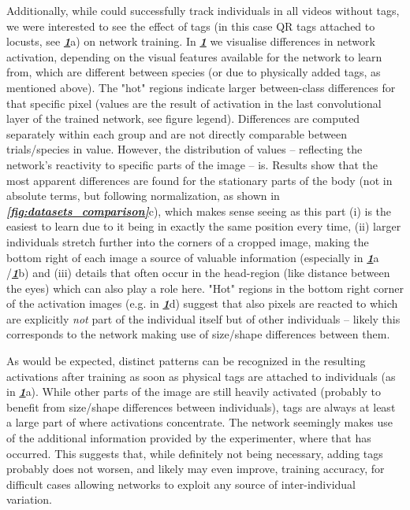 \documentclass[9pt,lineno]{elife}
\newcommand{\figref}[1]{\textit{\textbf{\ref{#1}}}}
\newcommand{\TRex}{\protect\path{TRex}}
\begin{document}
\begin{figure}[h]
\label{fig:network_activations}
\end{figure}

Additionally, while \TRex{} could successfully track individuals in all videos without tags, we were interested to see the effect of tags (in this case QR tags attached to locusts, see \figref{fig:network_activations}a)  %
on network training. In \figref{fig:network_activations} we visualise differences in network activation, depending on the visual features available for the network to learn from, which are different between species (or due to physically added tags, as mentioned above). The "hot" regions indicate larger between-class differences for that specific pixel (values are the result of activation in the last convolutional layer of the trained network, see figure legend). Differences are computed separately within each group and are not directly comparable between trials/species in value. However, the distribution of values -- reflecting the network's reactivity to specific parts of the image -- is. Results show that the most apparent differences are found for the stationary parts of the body (not in absolute terms, but following normalization, as shown in \figref{fig:datasets_comparison}c), which makes sense seeing as this part (i) is the easiest to learn due to it being in exactly the same position every time, (ii) larger individuals stretch further into the corners of a cropped image, making the bottom right of each image a source of valuable information (especially in \figref{fig:network_activations}a%
/\figref{fig:network_activations}b) %
and (iii) details that often occur in the head-region (like distance between the eyes) which can also play a role here. "Hot" regions in the bottom right corner of the activation images (e.g. in \figref{fig:network_activations}d) %
suggest that also pixels are reacted to which are explicitly \textit{not} part of the individual itself but of other individuals -- likely this corresponds to the network making use of size/shape differences between them.

As would be expected, distinct patterns can be recognized in the resulting activations after training as soon as physical tags are attached to individuals (as in \figref{fig:network_activations}a). %
While other parts of the image are still heavily activated (probably to benefit from size/shape differences between individuals), tags are always at least a large part of where activations concentrate. The network seemingly makes use of the additional information provided by the experimenter, where that has occurred. This suggests that, while definitely not being necessary, adding tags probably does not worsen, and likely may even improve, training accuracy, for difficult cases allowing networks to exploit any source of inter-individual variation.
\end{document}
